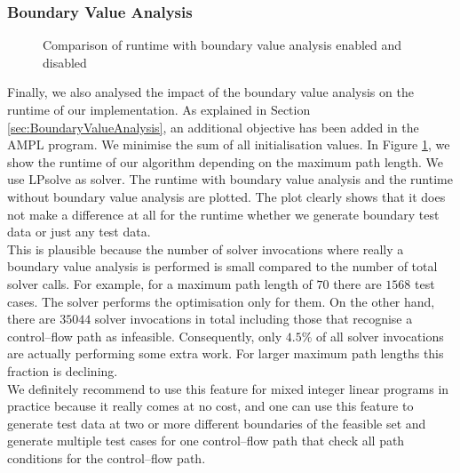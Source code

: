 \documentclass[runningheads,a4paper]{llncs}%
\begin{document}
\subsubsection{Boundary Value Analysis}
\label{sec:caseStudyBoundaryValues}
\begin{figure}
\begin{center}
%
\end{center}%
\caption{Comparison of runtime with boundary value analysis enabled and disabled}%
\label{fig:RuntimeBoundaryValue}%
\end{figure}%
Finally, we also analysed the impact of the boundary value analysis on the runtime of our implementation. As explained in Section \ref{sec:BoundaryValueAnalysis}, an additional objective has been added in the AMPL program. We minimise the sum of all initialisation values. In Figure \ref{fig:RuntimeBoundaryValue}, we show the runtime of our algorithm depending on the maximum path length. We use LPsolve as solver. The runtime with boundary value analysis and the runtime without boundary value analysis are plotted. The plot clearly shows that it does not make a difference at all for the runtime whether we generate boundary test data or just any test data.\\%
This is plausible because the number of solver invocations where really a boundary value analysis is performed is small compared to the number of total solver calls. For example, for a maximum path length of $70$ there are $1568$ test cases. The solver performs the optimisation only for them. On the other hand, there are $35044$ solver invocations in total including those that recognise a control--flow path as infeasible. Consequently, only $4.5\%$ of all solver invocations are actually performing some extra work. For larger maximum path lengths this fraction is declining.\\%
We definitely recommend to use this feature for mixed integer linear programs in practice because it really comes at no cost, and one can use this feature to generate test data at two or more different boundaries of the feasible set and generate multiple test cases for one control--flow path that check all path conditions for the control--flow path.%
\end{document}
